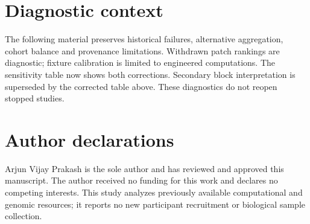\documentclass[10pt,letterpaper]{article}
\begin{document}
\section{Diagnostic context}
The following material preserves historical failures, alternative aggregation, cohort balance and provenance limitations. Withdrawn patch rankings are diagnostic; fixture calibration is limited to engineered computations. The sensitivity table now shows both corrections. Secondary block interpretation is superseded by the corrected table above. These diagnostics do not reopen stopped studies.
\FloatBarrier
\section*{Author declarations}
Arjun Vijay Prakash is the sole author and has reviewed and approved this manuscript. The author received no funding for this work and declares no competing interests. This study analyzes previously available computational and genomic resources; it reports no new participant recruitment or biological sample collection.
\clearpage
\end{document}
